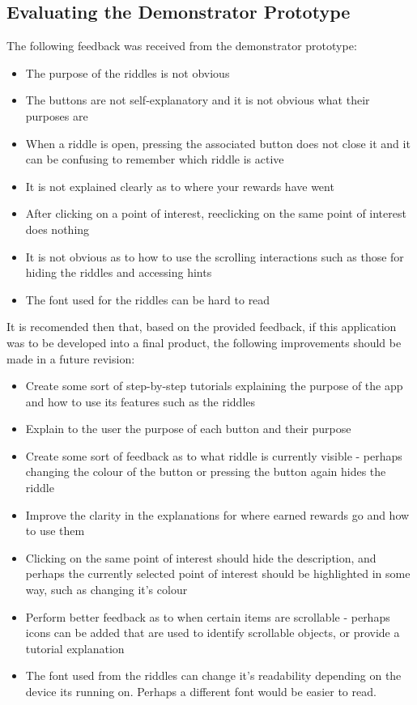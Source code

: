 \documentclass[10pt,twocolumn]{article} %
\begin{document}
\subsection*{Evaluating the Demonstrator Prototype}
The following feedback was received from the demonstrator prototype:
\begin{itemize}[noitemsep]
 \item The purpose of the riddles is not obvious 
 \item The buttons are not self-explanatory and it is not obvious what their purposes are
 \item When a riddle is open, pressing the associated button does not close it and it can be confusing to remember which riddle is active
 \item It is not explained clearly as to where your rewards have went
 \item After clicking on a point of interest, reeclicking on the same point of interest does nothing
 \item It is not obvious as to how to use the scrolling interactions such as those for hiding the riddles and accessing hints
 \item The font used for the riddles can be hard to read
\end{itemize}

It is recomended then that, based on the provided feedback, if this application was to be developed into a final product, the following improvements should be made in a future revision:
\begin{itemize}[noitemsep]
 \item Create some sort of step-by-step tutorials explaining the purpose of the app and how to use its features such as the riddles
 \item Explain to the user the purpose of each button and their purpose
 \item Create some sort of feedback as to what riddle is currently visible - perhaps changing the colour of the button or pressing the button again hides the riddle
 \item Improve the clarity in the explanations for where earned rewards go and how to use them
 \item Clicking on the same point of interest should hide the description, and perhaps the currently selected point of interest should be highlighted in some way, such as changing it's colour
 \item Perform better feedback as to when certain items are scrollable - perhaps icons can be added that are used to identify scrollable objects, or provide a tutorial explanation
 \item The font used from the riddles can change it's readability depending on the device its running on. Perhaps a different font would be easier to read.
\end{itemize}
\end{document}
